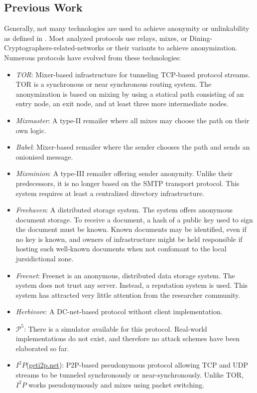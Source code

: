 \documentclass[runningheads]{llncs}
\begin{document}
\subsection{Previous Work}
Generally, not many technologies are used to achieve anonymity or unlinkability as defined in \cite{anon_terminology}. Most analyzed protocols use relays\cite{CHAUM1}, mixes\cite{CHAUM1}, or Dining-Cryptographers-related-networks\cite{chaum-dc} or their variants to achieve anonymization. Numerous protocols have evolved from these technologies:
\begin{itemize}
	\item \emph{TOR}\cite{tor-design}: Mixer-based infrastructure for tunneling TCP-based protocol streams. TOR is a synchronous or near synchronous routing system. The anonymization is based on mixing by using a statical path consisting of an entry node, an exit node, and at least three more intermediate nodes.
	\item \emph{Mixmaster}\cite{mixmaster-spec}: A type-II remailer where all mixes may choose the path on their own logic.
	\item \emph{Babel}\cite{babel}: Mixer-based remailer where the sender chooses the path and sends an onionised message.
	\item \emph{Mixminion}\cite{minion-design}: A type-III remailer offering sender anonymity. Unlike their predecessors, it is no longer based on the SMTP transport protocol. This system requires at least a centralized directory infrastructure.
	\item \emph{Freehaven}\cite{freehaven-berk}: A distributed storage system. The system offers anonymous document storage. To receive a document, a hash of a public key used to sign the document must be known. Known documents may be identified, even if no key is known, and owners of infrastructure might be held responsible if hosting such well-known documents when not confomant to the local jursidictional zone.
	\item \emph{Freenet}\cite{freenet}: Freenet is an anonymous, distributed data storage system. The system does not trust any server. Instead, a reputation system is used. This system has attracted very little attention from the researcher community.
	\item \emph{Herbivore}\cite{herbivore:tr}: A DC-net-based protocol without client implementation.
	\item \emph{$\mathcal{P}^5$}\cite{sherwood2005p5}: There is a simulator available for this protocol. Real-world implementations do not exist, and therefore no attack schemes have been elaborated so far.
	\item \emph{$I^2P$}(\href{https://geti2p.net/}{geti2p.net}): P2P-based pseudonymous protocol allowing TCP and UDP streams to be tunneled synchronously or near-synchronously. Unlike TOR, $I^2P$ works pseudonymously and mixes using packet switching. 
\end{itemize}
\end{document}
